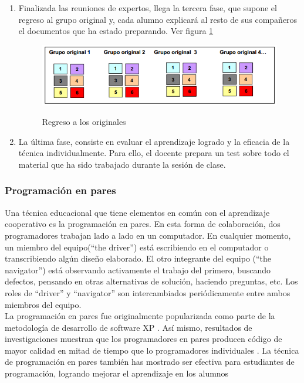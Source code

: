\begin{enumerate}
    \item Finalizada las reuniones de expertos, llega la tercera fase, que supone el regreso al grupo original y, cada alumno explicará al resto de sus compañeros el documentos que ha estado preparando. Ver figura \ref{fig:jigsaw03}
        
\begin{figure}[h]
  \centering
  \includegraphics[scale=0.6]{figuras/jigsaw03.png}\\
  \caption{Regreso a los originales}\label{fig:jigsaw03}
\end{figure}

\item La última fase, consiste en evaluar el aprendizaje logrado y la eficacia de la técnica individualmente. Para ello, el docente prepara un test sobre todo el material que ha sido trabajado durante la sesión de clase.

\end{enumerate}

\subsubsection{Programación en pares}
Una técnica educacional que tiene elementos en común con el aprendizaje cooperativo es la programación en pares. En esta forma de colaboración, dos programadores trabajan lado a lado en un computador. En cualquier momento, un miembro del equipo(``the driver'') está escribiendo en el computador o transcribiendo algún diseño elaborado. El otro integrante del equipo (``the navigator'') está observando activamente el trabajo del primero, buscando defectos, pensando en otras alternativas de solución, haciendo preguntas, etc. Los roles de ``driver'' y ``navigator'' son intercambiados periódicamente entre ambos miembros del equipo.\\

La programación en pares fue originalmente popularizada como parte de la metodología de desarrollo de software XP \cite{beck_extreme_2000}. Así mismo, resultados de investigaciones muestran que los programadores en pares producen código de mayor calidad en mitad de tiempo que lo programadores individuales \cite{williams2000collaborative} \cite{williams_strengthening_2000}. La técnica de programación en pares también has mostrado ser efectiva para estudiantes de programación, logrando mejorar el aprendizaje en los alumnos \cite{mcdowell_effects_2002}

